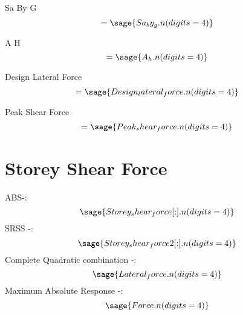 \documentclass[12pt]{report}
\begin{document}
Sa By G
\begin{equation}
	 [S_{{a}}]=\sage{Sa_by_g.n(digits=4)}
\end{equation}

A H
\begin{equation}
	[A_{{H}}]=\sage{A_h.n(digits=4)}
\end{equation}

Design Lateral Force
\begin{equation}
	[F]=\sage{Design_lateral_force.n(digits=4)}
\end{equation}

Peak Shear Force
\begin{equation}
	[V]=\sage{Peak_shear_force.n(digits=4)}
\end{equation}


\section{Storey Shear Force}
ABS-:
\begin{equation}
	\sage{Storey_shear_force[:].n(digits=4)}
\end{equation}
SRSS -:
\begin{equation}
	\sage{Storey_shear_force2[:].n(digits=4)}
\end{equation}
Complete Quadratic combination -:
\begin{equation}
	\sage{Lateral_force.n(digits=4)}
\end{equation}
Maximum Absolute Response -:
\begin{equation}
	\sage{Force.n(digits=4)}
\end{equation}
\end{document}
